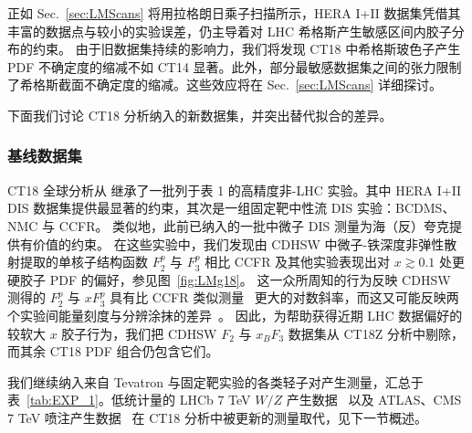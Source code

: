 正如 Sec.~\ref{sec:LMScans} 将用拉格朗日乘子扫描所示，HERA I+II 数据集凭借其丰富的数据点与较小的实验误差，仍主导着对 LHC 希格斯产生敏感区间内胶子分布的约束。
由于旧数据集持续的影响力，我们将发现 CT18 中希格斯玻色子产生 PDF 不确定度的缩减不如 CT14 显著。此外，部分最敏感数据集之间的张力限制了希格斯截面不确定度的缩减。这些效应将在 Sec.~\ref{sec:LMScans} 详细探讨。

下面我们讨论 CT18 分析纳入的新数据集，并突出替代拟合的差异。


\subsubsection{基线数据集 \label{sec:Baseline}}

CT18 全球分析从 \CTHERAII{} 继承了一批列于表 1 的高精度非-LHC 实验。其中 HERA I+II DIS 数据集提供最显著的约束，其次是一组固定靶中性流 DIS 实验：BCDMS、NMC 与 CCFR。
类似地，此前已纳入的一批中微子 DIS 测量为海（反）夸克提供有价值的约束。
在这些实验中，我们发现由 CDHSW 中微子-铁深度非弹性散射提取的单核子结构函数 $F_2^p$ 与 $F_3^p$ 相比 CCFR 及其他实验表现出对 $x \gtrsim 0.1$ 处更硬胶子 PDF 的偏好，参见图~\ref{fig:LMg18}。
这一众所周知的行为反映 CDHSW 测得的 $F_2^p$ 与 $x F_3^p$ 具有比 CCFR 类似测量~\cite{Seligman:1997fe} 更大的对数斜率，而这又可能反映两个实验间能量刻度与分辨涂抹的差异~\cite{Bodek:1996zu}。
因此，为帮助获得近期 LHC 数据偏好的较软大 $x$ 胶子行为，我们把 CDHSW $F_2$ 与 $x_B F_3$ 数据集从 CT18Z 分析中剔除，而其余 CT18 PDF 组合仍包含它们。

我们继续纳入来自 Tevatron 与固定靶实验的各类轻子对产生测量，汇总于表~\ref{tab:EXP_1}。低统计量的 LHCb 7 TeV $W/Z$ 产生数据~\cite{Aaij:2012vn} 以及 ATLAS、CMS 7 TeV 喷注产生数据~\cite{Aad:2011fc, Chatrchyan:2012bja} 在 CT18 分析中被更新的测量取代，见下一节概述。



\begingroup

